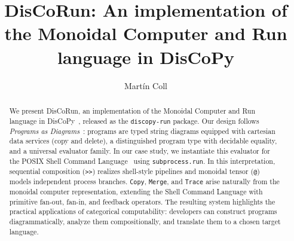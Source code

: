 \documentclass[runningheads]{llncs}
\begin{document}
%
\title{DisCoRun: An implementation of the Monoidal Computer and Run language in DisCoPy}
%
%
\author{Mart\'in Coll}
%
%
%
\maketitle              %
%
\begin{abstract}

We present DisCoRun, an implementation of the Monoidal Computer and Run language in DisCoPy~\cite{toumi2023discopyhierarchygraphicallanguages, de_Felice_2021}, released as the \texttt{discopy-run} package. Our design follows \emph{Programs as Diagrams}~\cite{pavlovic2023programsdiagramscategoricalcomputability}: programs are typed string diagrams equipped with cartesian data services (copy and delete), a distinguished program type with decidable equality, and a universal evaluator family.
In our case study, we instantiate this evaluator for the POSIX Shell Command Language~\cite{posix-2024} using \texttt{subprocess.run}. In this interpretation, sequential composition (\texttt{>>}) realizes shell-style pipelines and monoidal tensor (\texttt{@}) models independent process branches. \texttt{Copy}, \texttt{Merge}, and \texttt{Trace} arise naturally from the monoidal computer representation, extending the Shell Command Language with primitive fan-out, fan-in, and feedback operators. The resulting system highlights the practical applications of categorical computability: developers can construct programs diagrammatically, analyze them compositionally, and translate them to a chosen target language.



\end{abstract}
\end{document}
